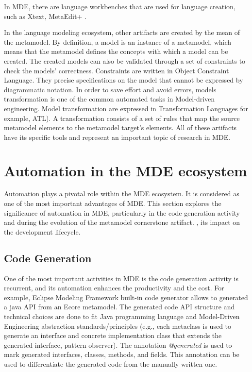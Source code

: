 In MDE, there are language workbenches that are used for language creation, such as Xtext, MetaEdit+ \cite{wortmann2020modeling}.



In the language modeling ecosystem, other artifacts are created by the mean of the metamodel. By definition, a model is an instance of a metamodel, which means that the metamodel defines the concepts with which a model can be created. The created models can also be validated through a set of constraints to check the models' correctness. Constraints are written in Object Constraint Language. They precise specifications on the model that cannot be  expressed by diagrammatic notation. In order to save effort and avoid errors, models transformation is one of the common automated tasks in Model-driven engineering. Model transformation are expressed in  Transformation Languages for example, ATL). A transformation consists of a set of rules that map the source metamodel elements to the metamodel target’s elements. All of these artifacts have its specific tools and represent an important topic of research in MDE.


\section{Automation in the MDE ecosystem}
\label{mde_automation}
 Automation plays a pivotal role within the MDE ecosystem. It is considered as one of the most important advantages of MDE. This section explores the significance of automation in MDE, particularly in the code generation activity and during the evolution of the metamodel cornerstone artifact. , its impact on the development lifecycle.%

\subsection{Code Generation}

One of the most important activities in MDE is the code generation activity is recurrent, and its automation enhances the productivity and the cost.
For example, Eclipse Modeling Framework built-in code generator allows to generated a java API from an Ecore metamodel. The generated code API structure and technical choices are done to fit Java programming language and Model-Driven Engineering abstraction standards/principles (e.g., each metaclass is used to generate an interface and concrete implementation class that extends the generated interface, pattern observer).
 The annotation \textit{@generated} is used to mark generated interfaces, classes, methods, and fields. This annotation can be used to differentiate the generated code from the manually written one.

